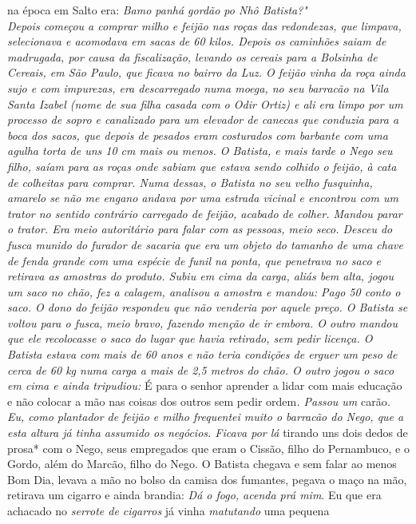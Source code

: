 \documentclass[12pt,brazil,]{book}
\begin{document}
na época em Salto era: \emph{Bamo panhá gordão po Nhô Batista?"\\
Depois começou a comprar milho e feijão nas roças das redondezas, que
limpava, selecionava e acomodava em sacas de 60 kilos. Depois os
caminhões saiam de madrugada, por causa da fiscalização, levando os
cereais para a Bolsinha de Cereais, em São Paulo, que ficava no bairro
da Luz. O feijão vinha da roça ainda sujo e com impurezas, era
descarregado numa moega, no seu barracão na Vila Santa Izabel (nome de
sua filha casada com o Odir Ortiz) e ali era limpo por um processo de
sopro e canalizado para um elevador de canecas que conduzia para a boca
dos sacos, que depois de pesados eram costurados com barbante com uma
agulha torta de uns 10 cm mais ou menos. O Batista, e mais tarde o Nego
seu filho, saíam para as roças onde sabiam que estava sendo colhido o
feijão, à cata de colheitas para comprar. Numa dessas, o Batista no seu
velho fusquinha, amarelo se não me engano andava por uma estrada vicinal
e encontrou com um trator no sentido contrário carregado de feijão,
acabado de colher. Mandou parar o trator. Era meio autoritário para
falar com as pessoas, meio seco. Desceu do fusca munido do furador de
sacaria que era um objeto do tamanho de uma chave de fenda grande com
uma espécie de funil na ponta, que penetrava no saco e retirava as
amostras do produto. Subiu em cima da carga, aliás bem alta, jogou um
saco no chão, fez a calagem, analisou a amostra e mandou: Pago 50 conto
o saco. O dono do feijão respondeu que não venderia por aquele preço. O
Batista se voltou para o fusca, meio bravo, fazendo menção de ir embora.
O outro mandou que ele recolocasse o saco do lugar que havia retirado,
sem pedir licença. O Batista estava com mais de 60 anos e não teria
condições de erguer um peso de cerca de 60 kg numa carga a mais de 2,5
metros do chão. O outro jogou o saco em cima e ainda tripudiou: }É para
o senhor aprender a lidar com mais educação e não colocar a mão nas
coisas dos outros sem pedir ordem\emph{. Passou um }carão\emph{.\\
Eu, como plantador de feijão e milho frequentei muito o barracão do
Nego, que a esta altura já tinha assumido os negócios. Ficava por lá
}tirando uns dois dedos de prosa* com o Nego, seus empregados que eram o
Cissão, filho do Pernambuco, e o Gordo, além do Marcão, filho do Nego. O
Batista chegava e sem falar ao menos Bom Dia, levava a mão no bolso da
camisa dos fumantes, pegava o maço na mão, retirava um cigarro e ainda
brandia: \emph{Dá o fogo, acenda prá mim}. Eu que era achacado no
\emph{serrote de cigarros} já vinha \emph{matutando} uma pequena
\end{document}
